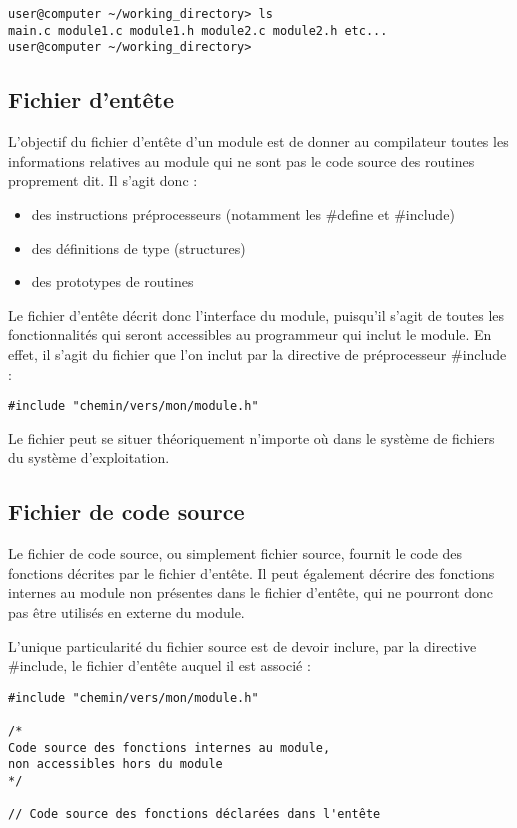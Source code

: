 \documentclass[../../../main.tex]{subfiles}
\begin{document}
\begin{verbatim}
user@computer ~/working_directory> ls
main.c module1.c module1.h module2.c module2.h etc...
user@computer ~/working_directory>
\end{verbatim}
\subsection{Fichier d'entête}
\label{sub:fichier_d_ent_te}
L'objectif du fichier d'entête d'un module est de donner au compilateur toutes les informations relatives au module qui ne sont pas le code source des routines proprement dit. Il s'agit donc :
\begin{itemize}
	\item des instructions préprocesseurs (notamment les \textsf{\#define} et \textsf{\#include})
	\item des définitions de type (structures)
	\item des prototypes de routines
\end{itemize}
Le fichier d'entête décrit donc l'interface du module, puisqu'il s'agit de toutes les fonctionnalités qui seront accessibles au programmeur qui inclut le module. En effet, il s'agit du fichier que l'on inclut par la directive de préprocesseur \textsf{\#include} :
\begin{verbatim}
#include "chemin/vers/mon/module.h"
\end{verbatim}
Le fichier peut se situer théoriquement n'importe où dans le système de fichiers du système d'exploitation.
\subsection{Fichier de code source}
\label{sub:fichier_de_code_source}
Le fichier de code source, ou simplement fichier source, fournit le code des fonctions décrites par le fichier d'entête. Il peut également décrire des fonctions internes au module non présentes dans le fichier d'entête, qui ne pourront donc pas être utilisés en externe du module.
 
L'unique particularité du fichier source est de devoir inclure, par la directive \textsf{\#include}, le fichier d'entête auquel il est associé :
\begin{verbatim}
#include "chemin/vers/mon/module.h"

/*
Code source des fonctions internes au module,
non accessibles hors du module
*/

// Code source des fonctions déclarées dans l'entête
\end{verbatim}
\end{document}
